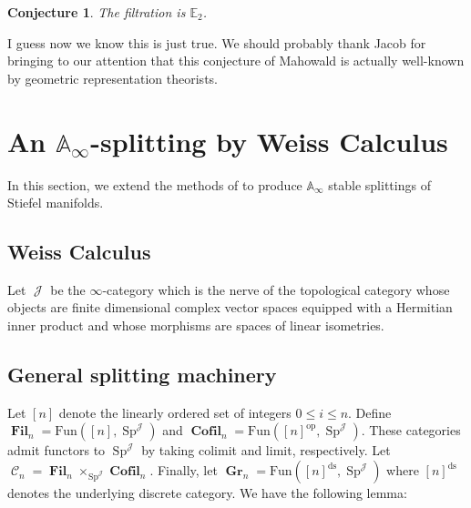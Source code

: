 \documentclass[11pt]{article}
\theoremstyle{definition}
\theoremstyle{plain}
\newtheorem{cnj}[nul]{Conjecture}
\numberwithin{equation}{nul}
\theoremstyle{TheoremNum}
\DeclareMathOperator{\C}{\mathcal{C}}
\DeclareMathOperator{\J}{\mathcal{J}}
\DeclareMathOperator{\Gr}{\textbf{Gr}}
\DeclareMathOperator{\Fil}{\textbf{Fil}}
\DeclareMathOperator{\Cofil}{\textbf{Cofil}}
\DeclareMathOperator{\Sp}{\text{Sp}}
\begin{document}
\begin{cnj} The filtration is $\mathbb{E}_2$.
\end{cnj}
I guess now we know this is just true.  We should probably thank Jacob for bringing to our attention that this conjecture of Mahowald is actually well-known by geometric representation theorists.  

\section{An $\mathbb{A}_\infty$-splitting by Weiss Calculus}


In this section, we extend the methods of \cite{Arone} to produce $\mathbb{A}_\infty$ stable splittings of Stiefel manifolds.  
\subsection{Weiss Calculus}
Let $\J$ be the $\infty$-category which is the nerve of the topological category whose objects are finite dimensional complex vector spaces equipped with a Hermitian inner product and whose morphisms are spaces of linear isometries.  


\subsection{General splitting machinery}


Let $[n]$ denote the linearly ordered set of integers $0\leq i\leq n$.  Define $\Fil_n = \text{Fun}([n], \Sp^{\J})$ and $\Cofil_n = \text{Fun}([n]^{\text{op}},\Sp^{\J})$.  These categories admit functors to $\Sp^{\J}$ by taking colimit and limit, respectively.  Let $\C_n = \Fil_n \times_{\Sp^{\J}} \Cofil_n.$  Finally, let $\Gr_n = \text{Fun}([n]^{\text{ds}}, \Sp^{\J})$ where $[n]^{\text{ds}}$ denotes the underlying discrete category.  We have the following lemma:
\end{document}
